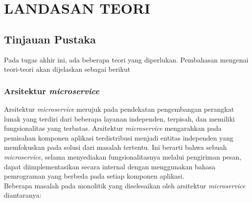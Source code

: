 \chapter{LANDASAN TEORI}
\vspace{4.5pt}

\section{Tinjauan Pustaka}
Pada tugas akhir ini, ada beberapa teori yang diperlukan. Pembahasan mengenai teori-teori akan dijelaskan sebagai berikut
\subsection{Arsitektur \textit{microservice}}
Arsitektur \textit{microservice} merujuk pada pendekatan pengembangan perangkat lunak yang terdiri dari beberapa layanan independen, terpisah, dan memiliki fungsionalitas yang terbatas. Arsitektur \textit{microservice} mengarahkan pada pemisahan komponen aplikasi terdistribusi menjadi entitas independen yang memfokuskan pada solusi dari masalah tertentu. Ini berarti bahwa sebuah \textit{microservice}, selama menyediakan fungsionalitasnya melalui pengiriman pesan, dapat diimplementasikan secara internal dengan menggunakan bahasa pemrograman yang berbeda pada setiap komponen aplikasi\cite{1}.\\
Beberapa masalah pada monolitik yang diselesaikan oleh arsitektur \textit{microservice} diantaranya\cite{1}:
